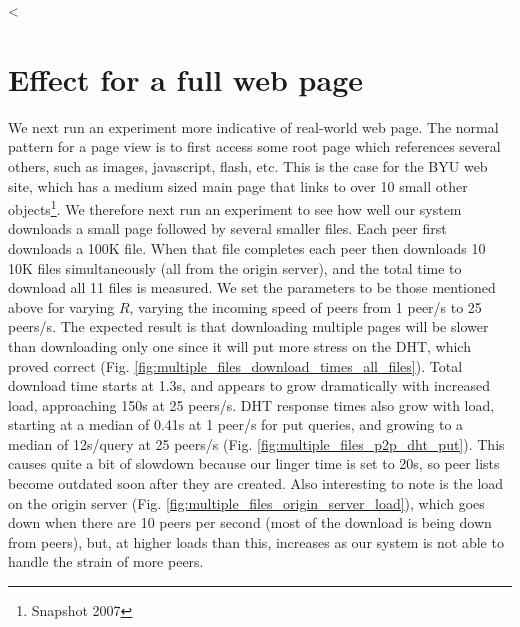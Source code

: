 
<%

\section{Effect for a full web page}

We next run an experiment more indicative of real-world web page. The normal pattern for a page view 
is to first access some root page which references several others, such as images, 
javascript, flash, etc. This is the case for the BYU web site, which has a medium sized main page that 
links to over 10 small other objects\footnote{ Snapshot 2007}. We therefore next run an experiment 
to see how well our system downloads a small page followed by several smaller files. Each peer first 
downloads a 100K file. When that file completes each peer then downloads 10 10K files simultaneously 
(all from the origin server), and the total time to download all 11 files is measured. We set the parameters 
to be those mentioned above for varying $R$, varying the incoming speed of peers from 1 peer/s to 25 peers/s. 
The expected result is that downloading multiple pages will be slower than downloading only one 
since it will put more stress on the DHT, which proved correct (Fig. \ref{fig:multiple_files_download_times_all_files}). 
Total download time starts at 1.3s, and appears to grow dramatically with increased load, approaching 
150s at 25 peers/s. DHT response times also grow with load, starting 
at a median of 0.41s at 1 peer/s for put queries, and growing to a median of 12s/query at 25 peers/s 
(Fig. \ref{fig:multiple_files_p2p_dht_put}). This causes quite a bit of slowdown because our
linger time is set to 20s, so peer lists become outdated soon after they are created.  Also interesting to note is 
the load on the origin server (Fig. \ref{fig:multiple_files_origin_server_load}), which goes down when there are 
 10 peers per second (most of the download is being down from peers), but, at higher loads than this, increases as our 
system is not able to handle the strain of more peers.


